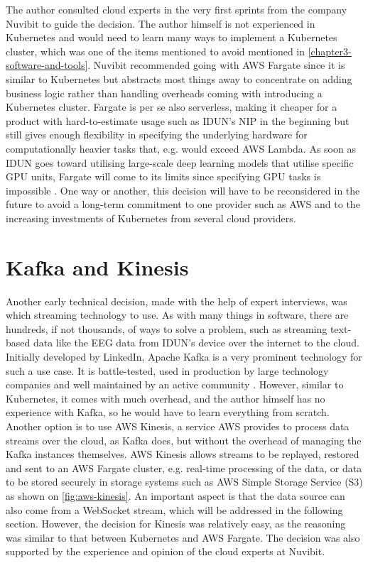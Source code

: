 The author consulted cloud experts in the very first sprints from the company Nuvibit to guide the decision. The author himself is not experienced in Kubernetes and would need to learn many ways to implement a Kubernetes cluster, which was one of the items mentioned to avoid mentioned in \autoref{chapter3-software-and-tools}. Nuvibit recommended going with AWS Fargate since it is similar to Kubernetes but abstracts most things away to concentrate on adding business logic rather than handling overheads coming with introducing a Kubernetes cluster. Fargate is per se also serverless, making it cheaper for a product with hard-to-estimate usage such as IDUN's NIP in the beginning but still gives enough flexibility in specifying the underlying hardware for computationally heavier tasks that, e.g. would exceed AWS Lambda. As soon as IDUN goes toward utilising large-scale deep learning models that utilise specific GPU units, Fargate will come to its limits since specifying GPU tasks is impossible \citep{amazon_web_services_inc_aws_2019}. One way or another, this decision will have to be reconsidered in the future to avoid a long-term commitment to one provider such as AWS and to the increasing investments of Kubernetes from several cloud providers.

\section*{Kafka and Kinesis}
\label{chapter4-kafka-aws-kinesis}

Another early technical decision, made with the help of expert interviews, was which streaming technology to use. As with many things in software, there are hundreds, if not thousands, of ways to solve a problem, such as streaming text-based data like the EEG data from IDUN's device over the internet to the cloud. Initially developed by LinkedIn, Apache Kafka is a very prominent technology for such a use case. It is battle-tested, used in production by large technology companies \citep{apache_apache_nodate} and well maintained by an active community \citep{noauthor_apache_2022}. However, similar to Kubernetes, it comes with much overhead, and the author himself has no experience with Kafka, so he would have to learn everything from scratch. Another option is to use AWS Kinesis, a service AWS provides to process data streams over the cloud, as Kafka does, but without the overhead of managing the Kafka instances themselves. AWS Kinesis allows streams to be replayed, restored and sent to an AWS Fargate cluster, e.g. real-time processing of the data, or data to be stored securely in storage systems such as AWS Simple Storage Service (S3) as shown on \autoref{fig:aws-kinesis}. An important aspect is that the data source can also come from a WebSocket stream, which will be addressed in the following section. However, the decision for Kinesis was relatively easy, as the reasoning was similar to that between Kubernetes and AWS Fargate. The decision was also supported by the experience and opinion of the cloud experts at Nuvibit.

